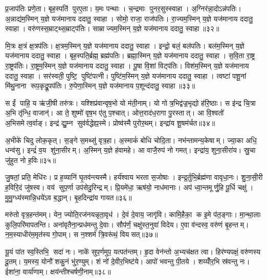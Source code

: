 प्र॒जाप॑तिः प्रणे॒ता। बृह॒स्पति॑ पुरए॒ता। य॒मः पन्थाः। च॒न्द्रमाः पुनर॒सुस्स्वाहा। अ॒ग्निर॑न्ना॒दोऽन्न॑पतिः। अ॒न्नाद्य॑म॒स्मिन् य॒ज्ञे यज॑मानाय ददातु॒ स्वाहा। सोमो॒ राजा॒ राज॑पतिः। रा॒ज्यम॒स्मिन् य॒ज्ञे यज॑मानाय ददातु॒ स्वाहा। वरु॑णस्स॒म्राट्थ्स॒म्राट्प॑तिः। साम्राज्यम॒स्मिन् य॒ज्ञे यज॑मानाय ददातु॒ स्वाहा॥३२॥

मि॒त्रः क्ष॒त्रं क्ष॒त्रप॑तिः। क्ष॒त्रम॒स्मिन् य॒ज्ञे यज॑मानाय ददातु॒ स्वाहा। इन्द्रो॒ बलं॒ बल॑पतिः। बल॑म॒स्मिन् य॒ज्ञे यज॑मानाय ददातु॒ स्वाहा। बृह॒स्पति॒र्ब्रह्म॒ ब्रह्म॑पतिः। ब्रह्मा॒स्मिन् य॒ज्ञे यज॑मानाय ददातु॒ स्वाहा। स॒वि॒ता रा॒ष्ट्र रा॒ष्ट्रप॑तिः। रा॒ष्ट्रम॒स्मिन् य॒ज्ञे यज॑मानाय ददातु॒ स्वाहा। पू॒षा वि॒शां विट्प॑तिः। विश॑म॒स्मिन् य॒ज्ञे यज॑मानाय ददातु॒ स्वाहा। सर॑स्वती॒ पुष्टि॒ पुष्टि॑पत्नी। पुष्टि॑म॒स्मिन् य॒ज्ञे यज॑मानाय ददातु॒ स्वाहा। त्वष्टा॑ पशू॒नां मि॑थु॒नाना रूप॒कृद्रू॒पप॑तिः। रु॒पेणा॒स्मिन् य॒ज्ञे यज॑मानाय प॒शून्द॑दातु॒ स्वाहा॥३३॥\anuvakamend[च॒ स्वाहा॒ साम्राज्यम॒स्मिन् य॒ज्ञे यज॑मानाय ददातु॒ स्वाहा॒ विश॑म॒स्मिन् य॒ज्ञे यज॑मानाय ददातु॒ स्वाहा॑ च॒त्वारि॑ च (अ॒ग्निस्सोमो॒ वरु॑णो मि॒त्र इन्द्रो॒ बृह॒स्पति॑ सवि॒ता पू॒षा सर॑स्वती॒ त्वष्टा॒ दश॑ ॥ )]

स ईं पाहि॒ य ऋ॑जी॒षी तरु॑त्रः। यश्शिप्र॑वान्वृष॒भो यो म॑ती॒नाम्। यो गोत्र॒भिद्व॑ज्र॒भृद्यो ह॑रि॒ष्ठाः। स इ॑न्द्र चि॒त्रा अ॒भि तृ॑न्धि॒ वाजान्॑। आ ते॒ शुष्मो॑ वृष॒भ ए॑तु प॒श्चात्। ओत्त॒राद॑ध॒रागा पु॒रस्तात्। आ वि॒श्वतो॑ अ॒भिसमेत्व॒र्वाङ्। इन्द्र॑ द्यु॒म्न सुव॑र्वद्धेह्य॒स्मे। प्रोष्व॑स्मै पुरोर॒थम्। इन्द्रा॑य शू॒षम॑र्चत॥३४॥

अ॒भीके॑ चिदु लोक॒कृत्। स॒ङ्गे स॒मथ्सु॑ वृत्र॒हा। अ॒स्माकं॑ बोधि चोदि॒ता। नभ॑न्तामन्य॒केषाम्। ज्या॒का अधि॒ धन्व॑सु। इन्द्रं॑ व॒य शु॑ना॒सीरम्। अ॒स्मिन् य॒ज्ञे ह॑वामहे। आ वाजै॒रुप॑ नो गमत्। इन्द्रा॑य॒ शुना॒सीरा॑य। स्रु॒चा जु॑हुत नो ह॒विः॥३५॥

जु॒षतां॒ प्रति॒ मेधि॑रः। प्र ह॒व्यानि॑ घृ॒तव॑न्त्यस्मै। हर्य॑श्वाय भरता स॒जोषाः। इन्द्र॒र्तुभि॒र्ब्रह्म॑णा वावृधा॒नः। शु॒ना॒सी॒री ह॒विरि॒दं जु॑षस्व। वय॑ सुप॒र्णा उप॑सेदु॒रिन्द्रम्। प्रि॒यमे॑धा॒ ऋष॑यो॒ नाध॑मानाः। अप॑ ध्वा॒न्तमूर्णु॒हि पू॒र्धि चक्षु॑। मु॒मु॒ग्ध्य॑स्मान्नि॒धये॑ऽव ब॒द्धान्। बृ॒हदिन्द्रा॑य गायत॥३६॥

मरु॑तो वृत्र॒हन्त॑मम्। येन॒ ज्योति॒रज॑नयन्नृता॒वृध॑। दे॒वं दे॒वाय॒ जागृ॑वि। कामि॒हैका॒ क इ॒मे प॑त॒ङ्गाः। मा॒न्था॒लाः कुलि॒परि॑मापतन्ति। अना॑वृतैना॒न्प्रध॑मन्तु दे॒वाः। सौप॑र्णं॒ चक्षु॑स्त॒नुवा॑ विदेय। ए॒वा व॑न्दस्व॒ वरु॑णं बृ॒हन्तम्। न॒म॒स्याधीर॑म॒मृत॑स्य गो॒पाम्। स न॒श्शर्म॑ त्रि॒वरू॑थं॒ वियसत्॥३७॥

यू॒यं पा॑त स्व॒स्तिभि॒ सदा॑ नः। नाके॑ सुप॒र्णमुप॒ यत्पत॑न्तम्। हृ॒दा वेन॑न्तो अ॒भ्यच॑क्षत त्वा। हिर॑ण्यपक्षं॒ वरु॑णस्य दू॒तम्। य॒मस्य॒ योनौ॑ शकु॒नं भु॑र॒ण्युम्। शं नो॑ दे॒वीर॒भिष्ट॑ये। आपो॑ भवन्तु पी॒तये। शय्योँर॒भि स्र॑वन्तु नः। ईशा॑ना॒ वार्या॑णाम्। क्षय॑न्तीश्चर्\mbox{}षणी॒नाम्॥३८॥

